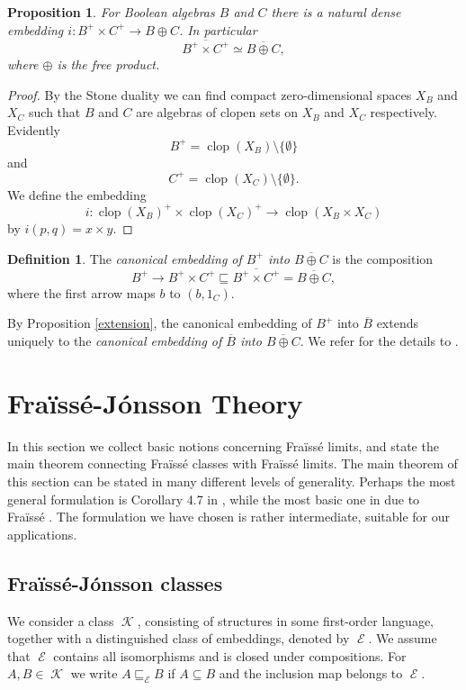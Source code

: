 \documentclass[11pt]{amsart}
\newtheorem{prop}[thm]{Proposition}
\theoremstyle{definition}
\newtheorem{defin}[thm]{Definition}
\DeclareMathOperator{\K}{\mathcal K}
\DeclareMathOperator{\E}{\mathcal E}
\begin{document}
\begin{prop}
For Boolean algebras $B$ and $C$ there is a natural dense embedding $i:B^+\times C^+ \rightarrow B\oplus C$. In particular
$$\overline{B^+\times C^+}\simeq \overline{B \oplus C},$$
where $\oplus$ is the free product. 
\end{prop}
\begin{proof}
By the Stone duality we can find compact zero-dimensional spaces $X_B$ and $X_C$ such that $B$ and $C$ are algebras of clopen sets on $X_B$ and $X_C$ respectively. Evidently $$B^+=\operatorname{clop}(X_B)\setminus \{\emptyset \}$$
and
$$C^+=\operatorname{clop}(X_C)\setminus \{\emptyset \}.$$
We define the embedding 
$$i:\operatorname{clop}(X_B)^+\times \operatorname{clop}(X_C)^+ \rightarrow \operatorname{clop}(X_B\times X_C)$$
by $i(p,q)=x\times y$. 
    
\end{proof}

\begin{defin}
The \emph{canonical embedding of $B^+$  into $\overline{B \oplus C}$} is the composition
$$B^+\longrightarrow B^+\times C^+ \sqsubseteq \overline{B^+\times C^+}=\overline{B \oplus C},$$
where the first arrow maps $b$ to $(b,1_C)$.
\end{defin}
By Proposition \ref{extension}, the canonical embedding of $B^+$ into $\overline{B}$ extends uniquely to the \emph{canonical embedding of $\overline{B}$ into $\overline{B \oplus C}$}. We refer for the details to \cite{bool}. 


\section{Fra\"iss\'e-J\'onsson Theory}

In this section we collect basic notions concerning Fra\"iss\'e limits, and state the main theorem connecting Fra\"iss\'e classes with Fra\"iss\'e limits. The main theorem of this section can be stated in many different levels of generality. Perhaps the most general formulation is Corollary 4.7 in \cite{kub}, while the most basic one in due to Fra\"iss\'e \cite{fraisse}.  The formulation we have chosen is rather intermediate, suitable for our applications.

\subsection{Fra\"iss\'e-J\'onsson classes}

We consider a class $\K$, consisting of structures in some first-order language, together with a distinguished class of embeddings, denoted by $\E$. We assume that $\E$ contains all isomorphisms and is closed under compositions. For $A,B \in \K$ we write $A\sqsubseteq_{\E}B$ if $A\subseteq B$ and the inclusion map belongs to $\E$.
\end{document}
